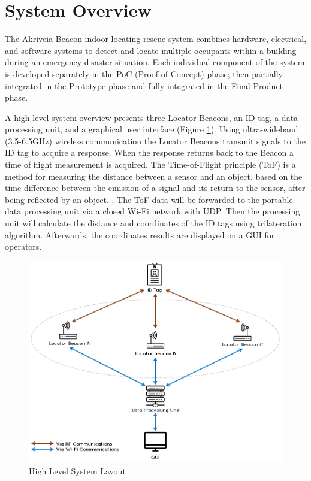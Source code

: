 

\setcounter{section}{1}
\section{System Overview}
\bigskip

The Akriveia Beacon indoor locating rescue system combines hardware, electrical, and software systems to detect and locate multiple occupants within a building during an emergency disaster situation. Each individual component of the system is developed separately in the PoC (Proof of Concept) phase; then partially integrated in the Prototype phase and fully integrated in the Final Product phase. 

\bigskip
A high-level system overview presents three Locator Beacons, an ID tag, a data processing unit, and a graphical user interface (Figure \ref{sys_arch}). Using ultra-wideband (3.5-6.5GHz) wireless communication the Locator Beacons transmit signals to the ID tag to acquire a response. When the response returns back to the Beacon a time of flight measurement is acquired. The Time-of-Flight principle (\Gls{ToF}) is a method for measuring the distance between a sensor and an object, based on the time difference between the emission of a signal and its return to the sensor, after being reflected by an object. \cite{R2-0}. The ToF data will be forwarded to the portable data processing unit via a closed Wi-Fi network with \Gls{UDP}.  Then the processing unit will calculate the distance and coordinates of the ID tags using trilateration algorithm. Afterwards, the coordinates results are displayed on a GUI for operators.

\medskip
\begin{figure}[H]
\centering
    \includegraphics[scale=0.65]{./images/00_sys_arch.png}
    \caption{High Level System Layout}
    \label{sys_arch}
\end{figure}



